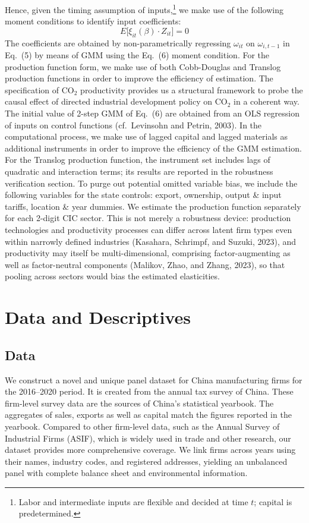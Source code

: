 \documentclass[11pt,a4paper]{article}
\begin{document}
Hence, given the timing assumption of inputs,\footnote{Labor and intermediate inputs are flexible and decided at time $t$; capital is predetermined.} we make use of the following moment conditions to identify input coefficients:
\begin{equation}
E\bigl[\xi_{it}({\beta})\cdot Z_{it}\bigr] = 0
\end{equation}
The coefficients are obtained by non-parametrically regressing $\omega_{it}$ on $\omega_{i,t-1}$ in Eq.~(5) by means of GMM using the Eq.~(6) moment condition. For the production function form, we make use of both Cobb-Douglas and Translog production functions in order to improve the efficiency of estimation. The specification of CO$_2$ productivity provides us a structural framework to probe the causal effect of directed industrial development policy on CO$_2$ in a coherent way. The initial value of 2-step GMM of Eq.~(6) are obtained from an OLS regression of inputs on control functions (cf.\ Levinsohn and Petrin, 2003). In the computational process, we make use of lagged capital and lagged materials as additional instruments in order to improve the efficiency of the GMM estimation. For the Translog production function, the instrument set includes lags of quadratic and interaction terms; its results are reported in the robustness verification section. To purge out potential omitted variable bias, we include the following variables for the state controls: export, ownership, output \& input tariffs, location \& year dummies. We estimate the production function separately for each 2-digit CIC sector. This is not merely a robustness device: production technologies and productivity processes can differ across latent firm types even within narrowly defined industries (Kasahara, Schrimpf, and Suzuki, 2023), and productivity may itself be multi-dimensional, comprising factor-augmenting as well as factor-neutral components (Malikov, Zhao, and Zhang, 2023), so that pooling across sectors would bias the estimated elasticities.

\section{Data and Descriptives}

\subsection{Data}

We construct a novel and unique panel dataset for China manufacturing firms for the 2016--2020 period. It is created from the annual tax survey of China. These firm-level survey data are the sources of China's statistical yearbook. The aggregates of sales, exports as well as capital match the figures reported in the yearbook. Compared to other firm-level data, such as the Annual Survey of Industrial Firms (ASIF), which is widely used in trade and other research, our dataset provides more comprehensive coverage. We link firms across years using their names, industry codes, and registered addresses, yielding an unbalanced panel with complete balance sheet and environmental information.
\end{document}
